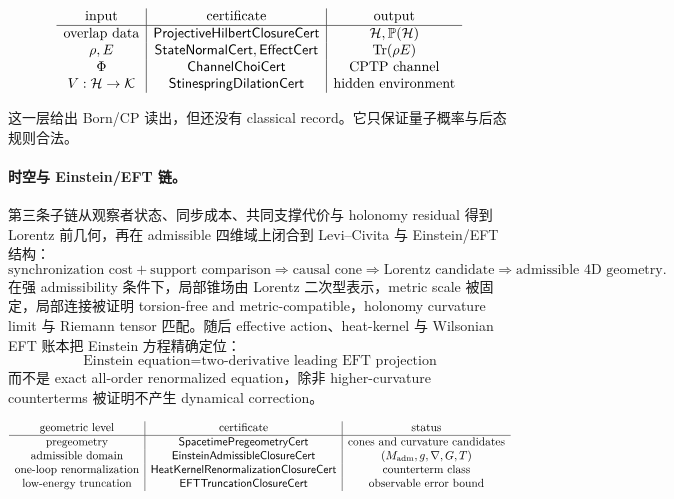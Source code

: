 \[
\begin{array}{c|c|c}
\text{input} & \text{certificate} & \text{output}\\
\hline
\text{overlap data} & \mathsf{ProjectiveHilbertClosureCert} & \mathcal H,\mathbb P(\mathcal H)\\
\rho,E & \mathsf{StateNormalCert},\mathsf{EffectCert} & {\rm Tr}(\rho E)\\
\Phi & \mathsf{ChannelChoiCert} & \text{CPTP channel}\\
V:\mathcal H\to\mathcal K & \mathsf{StinespringDilationCert} & \text{hidden environment}
\end{array}
\]

这一层给出 Born/CP 读出，但还没有 classical record。它只保证量子概率与后态规则合法。

\paragraph{时空与 Einstein/EFT 链。}
第三条子链从观察者状态、同步成本、共同支撑代价与 holonomy residual 得到 Lorentz 前几何，再在 admissible 四维域上闭合到 Levi--Civita 与 Einstein/EFT 结构：
\[
\boxed{
\text{synchronization cost}
+
\text{support comparison}
\Rightarrow
\text{causal cone}
\Rightarrow
\text{Lorentz candidate}
\Rightarrow
\text{admissible }4\text{D geometry}.
}
\]
在强 admissibility 条件下，局部锥场由 Lorentz 二次型表示，metric scale 被固定，局部连接被证明 torsion-free and metric-compatible，holonomy curvature limit 与 Riemann tensor 匹配。随后 effective action、heat-kernel 与 Wilsonian EFT 账本把 Einstein 方程精确定位：
\[
\boxed{
\text{Einstein equation}
=
\text{two-derivative leading EFT projection}
}
\]
而不是 exact all-order renormalized equation，除非 higher-curvature counterterms 被证明不产生 dynamical correction。

\[
\begin{array}{c|c|c}
\text{geometric level} & \text{certificate} & \text{status}\\
\hline
\text{pregeometry} & \mathsf{SpacetimePregeometryCert} & \text{cones and curvature candidates}\\
\text{admissible domain} & \mathsf{EinsteinAdmissibleClosureCert} & (M_{\rm adm},g,\nabla,G,T)\\
\text{one-loop renormalization} & \mathsf{HeatKernelRenormalizationClosureCert} & \text{counterterm class}\\
\text{low-energy truncation} & \mathsf{EFTTruncationClosureCert} & \text{observable error bound}
\end{array}
\]


